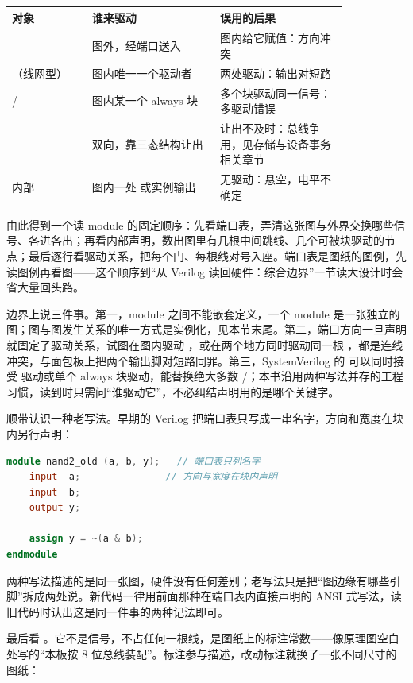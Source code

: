 \begin{longtable}{L{0.2\linewidth}L{0.32\linewidth}L{0.32\linewidth}}
\toprule
对象 & 谁来驱动 & 误用的后果 \\
\midrule
{} & 图外，经端口送入 & 图内给它赋值：方向冲突 \\\tablerowrule
{}（线网型） & 图内唯一一个驱动者 & 两处驱动：输出对短路 \\\tablerowrule
{}/ & 图内某一个 always 块 & 多个块驱动同一信号：多驱动错误 \\\tablerowrule
{} & 双向，靠三态结构让出 & 让出不及时：总线争用，见存储与设备事务相关章节 \\\tablerowrule
内部  & 图内一处  或实例输出 & 无驱动：悬空，电平不确定 \\
\bottomrule
\end{longtable}

由此得到一个读 module 的固定顺序：先看端口表，弄清这张图与外界交换哪些信号、各进各出；再看内部声明，数出图里有几根中间跳线、几个可被块驱动的节点；最后逐行看驱动关系，把每个门、每根线对号入座。端口表是图纸的图例，先读图例再看图——这个顺序到“从 Verilog 读回硬件：综合边界”一节读大设计时会省大量回头路。

边界上说三件事。第一，module 之间不能嵌套定义，一个 module 是一张独立的图；图与图发生关系的唯一方式是实例化，见本节末尾。第二，端口方向一旦声明就固定了驱动关系，试图在图内驱动 ，或在两个地方同时驱动同一根 ，都是连线冲突，与面包板上把两个输出脚对短路同罪。第三，SystemVerilog 的  可以同时接受  驱动或单个 always 块驱动，能替换绝大多数 /；本书沿用两种写法并存的工程习惯，读到时只需问“谁驱动它”，不必纠结声明用的是哪个关键字。

顺带认识一种老写法。早期的 Verilog 把端口表只写成一串名字，方向和宽度在块内另行声明：

\begin{lstlisting}[language=Verilog]
module nand2_old (a, b, y);   // 端口表只列名字
    input  a;               // 方向与宽度在块内声明
    input  b;
    output y;

    assign y = ~(a & b);
endmodule
\end{lstlisting}

两种写法描述的是同一张图，硬件没有任何差别；老写法只是把“图边缘有哪些引脚”拆成两处说。新代码一律用前面那种在端口表内直接声明的 ANSI 式写法，读旧代码时认出这是同一件事的两种记法即可。

最后看 。它不是信号，不占任何一根线，是图纸上的标注常数——像原理图空白处写的“本板按 8 位总线装配”。标注参与描述，改动标注就换了一张不同尺寸的图纸：

